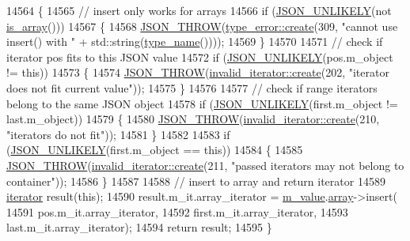 \begin{DoxyCode}
14564     \{
14565         \textcolor{comment}{// insert only works for arrays}
14566         \textcolor{keywordflow}{if} (\hyperlink{json_8hpp_ab77582407c64944e7db1ea95ab520253}{JSON\_UNLIKELY}(not \hyperlink{classnlohmann_1_1basic__json_aef9ce5dd2381caee1f8ddcdb5bdd9c65}{is\_array}()))
14567         \{
14568             \hyperlink{json_8hpp_a6c274f6db2e65c1b66c7d41b06ad690f}{JSON\_THROW}(\hyperlink{classnlohmann_1_1detail_1_1type__error_aecc083aea4b698c33d042670ba50c10f}{type\_error::create}(309, \textcolor{stringliteral}{"cannot use insert() with "} + 
      std::string(\hyperlink{classnlohmann_1_1basic__json_a9d0a478571f82f0163b96b2424cd998f}{type\_name}())));
14569         \}
14570 
14571         \textcolor{comment}{// check if iterator pos fits to this JSON value}
14572         \textcolor{keywordflow}{if} (\hyperlink{json_8hpp_ab77582407c64944e7db1ea95ab520253}{JSON\_UNLIKELY}(pos.m\_object != \textcolor{keyword}{this}))
14573         \{
14574             \hyperlink{json_8hpp_a6c274f6db2e65c1b66c7d41b06ad690f}{JSON\_THROW}(\hyperlink{classnlohmann_1_1detail_1_1invalid__iterator_a4e849260a3caa1b288c7e619130c6c09}{invalid\_iterator::create}(202, \textcolor{stringliteral}{"iterator does not
       fit current value"}));
14575         \}
14576 
14577         \textcolor{comment}{// check if range iterators belong to the same JSON object}
14578         \textcolor{keywordflow}{if} (\hyperlink{json_8hpp_ab77582407c64944e7db1ea95ab520253}{JSON\_UNLIKELY}(first.m\_object != last.m\_object))
14579         \{
14580             \hyperlink{json_8hpp_a6c274f6db2e65c1b66c7d41b06ad690f}{JSON\_THROW}(\hyperlink{classnlohmann_1_1detail_1_1invalid__iterator_a4e849260a3caa1b288c7e619130c6c09}{invalid\_iterator::create}(210, \textcolor{stringliteral}{"iterators do not
       fit"}));
14581         \}
14582 
14583         \textcolor{keywordflow}{if} (\hyperlink{json_8hpp_ab77582407c64944e7db1ea95ab520253}{JSON\_UNLIKELY}(first.m\_object == \textcolor{keyword}{this}))
14584         \{
14585             \hyperlink{json_8hpp_a6c274f6db2e65c1b66c7d41b06ad690f}{JSON\_THROW}(\hyperlink{classnlohmann_1_1detail_1_1invalid__iterator_a4e849260a3caa1b288c7e619130c6c09}{invalid\_iterator::create}(211, \textcolor{stringliteral}{"passed iterators
       may not belong to container"}));
14586         \}
14587 
14588         \textcolor{comment}{// insert to array and return iterator}
14589         \hyperlink{classnlohmann_1_1basic__json_a099316232c76c034030a38faa6e34dca}{iterator} result(\textcolor{keyword}{this});
14590         result.m\_it.array\_iterator = \hyperlink{classnlohmann_1_1basic__json_aeb0814f76966f99290cb29e127c90a77}{m\_value}.\hyperlink{unionnlohmann_1_1basic__json_1_1json__value_a7947687f3ae1911d6e9847e2b3226157}{array}->insert(
14591                                          pos.m\_it.array\_iterator,
14592                                          first.m\_it.array\_iterator,
14593                                          last.m\_it.array\_iterator);
14594         \textcolor{keywordflow}{return} result;
14595     \}
\end{DoxyCode}
